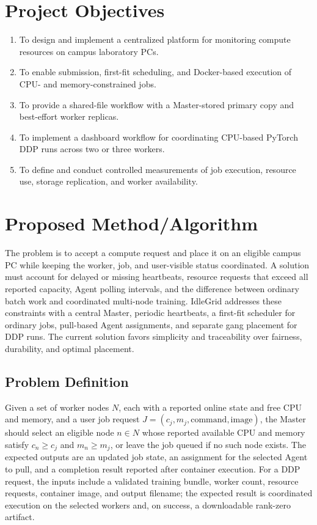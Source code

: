 \documentclass{article}
\begin{document}
	\section{Project Objectives}
    \begin{enumerate}
      \item To design and implement a centralized platform for monitoring compute resources on campus laboratory PCs.
      \item To enable submission, first-fit scheduling, and Docker-based execution of CPU- and memory-constrained jobs.
      \item To provide a shared-file workflow with a Master-stored primary copy and best-effort worker replicas.
      \item To implement a dashboard workflow for coordinating CPU-based PyTorch DDP runs across two or three workers.
      \item To define and conduct controlled measurements of job execution, resource use, storage replication, and worker availability.
    \end{enumerate}
	\pagebreak	
	\section{Proposed Method/Algorithm }
The problem is to accept a compute request and place it on an eligible campus PC while keeping the worker, job, and user-visible status coordinated. A solution must account for delayed or missing heartbeats, resource requests that exceed all reported capacity, Agent polling intervals, and the difference between ordinary batch work and coordinated multi-node training. IdleGrid addresses these constraints with a central Master, periodic heartbeats, a first-fit scheduler for ordinary jobs, pull-based Agent assignments, and separate gang placement for DDP runs. The current solution favors simplicity and traceability over fairness, durability, and optimal placement.

	\subsection{Problem Definition}

Given a set of worker nodes \(N\), each with a reported online state and free CPU and memory, and a user job request \(J=(c_j,m_j,\mathrm{command},\mathrm{image})\), the Master should select an eligible node \(n\in N\) whose reported available CPU and memory satisfy \(c_n\ge c_j\) and \(m_n\ge m_j\), or leave the job queued if no such node exists. The expected outputs are an updated job state, an assignment for the selected Agent to pull, and a completion result reported after container execution. For a DDP request, the inputs include a validated training bundle, worker count, resource requests, container image, and output filename; the expected result is coordinated execution on the selected workers and, on success, a downloadable rank-zero artifact.
\end{document}

